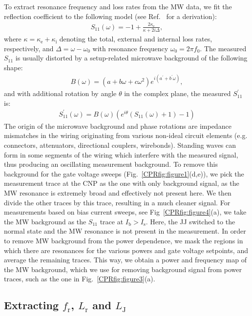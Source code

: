 To extract resonance frequency and loss rates from the MW data, we fit the reflection coefficient to the following model (see Ref.~\cite{bosmanBroadbandArchitectureGalvanically2015c} for a derivation):
%
\begin{align}
S_{11}(\omega) = -1+\frac{2\kappa_\text{e}}{\kappa+2i\Delta},
\end{align}
%
where $\kappa=\kappa_\text{e}+\kappa_\text{i}$ denoting the total, external and internal loss rates, respectively, and $\Delta=\omega-\omega_0$ with resonance frequency $\omega_0=2\pi f_0$.
%
The measured $S_{11}$ is usually distorted by a setup-related microwave background of the following shape:
\begin{align}
B(\omega) = \left(a+b\omega+c\omega^2\right)e^{i\left(a^\prime+b^\prime\omega\right)},
\end{align}
%
and with additional rotation by angle $\theta$ in the complex plane, the measured $S_{11}^\prime$ is:
\begin{align}
S_{11}^\prime(\omega)=B(\omega)\left(e^{i\theta}\left(S_{11}(\omega)+1\right)-1\right)
\end{align}
%
The origin of the microwave background and phase rotations are impedance mismatches in the wiring originating from various non-ideal circuit elements (e.g. connectors, attenuators, directional couplers, wirebonds).
%
Standing waves can form in some segments of the wiring which interfere with the measured signal, thus producing an oscillating measurement background.
%
To remove this background for the gate voltage sweeps (Fig.~\ref{CPRfig:figure1}(d,e)), we pick the measurement trace at the CNP as the one with only background signal, as the MW resonance is extremely broad and effectively not present here.
%
We then divide the other traces by this trace, resulting in a much cleaner signal.
%
For measurements based on bias current sweeps, see Fig~\ref{CPRfig:figure4}(a), we take the MW background as the $S_{11}$ trace at $I_\text{b}>I_\text{s}$.
%
Here, the JJ switched to the normal state and the MW resonance is not present in the measurement.
%
In order to remove MW background from the power dependence, we mask the regions in which there are resonances for the various powers and gate voltage setpoints, and average the remaining traces.
%
This way, we obtain a power and frequency map of the MW background, which we use for removing background signal from power traces, such as the one in Fig.~\ref{CPRfig:figure3}(a).

\subsection{Extracting $f_\text{r}$, $L_\text{r}$ and $L_\text{J}$}\label{sec:SMcalibration}

